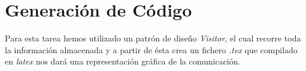 
\section{Generación de Código}

Para esta tarea hemos utilizado un patrón de diseño \textit{Visitor},
el cual recorre toda la información almacenada y a partir de ésta crea
un fichero \textit{.tex} que compilado en \textit{latex} nos dará una
representación gráfica de la comunicación.

